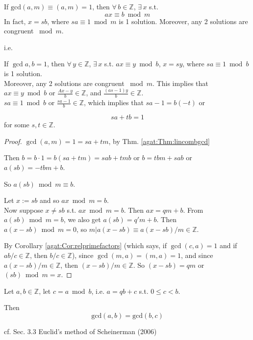 \begin{theorem}\label{agat:Thm:relprimeinvertible} 
If $\text{gcd}(a,m) \equiv (a,m) = 1$, then $\forall \, b \in \mathbb{Z}$, $\exists \, x $ s.t. 
\[
ax \equiv b\bmod{m}
\]
In fact, $x=sb$, where $sa\equiv 1\bmod{m}$ is 1 solution.  Moreover, any 2 solutions are congruent $\bmod{m}$.

i.e.  

If $\gcd{a,b} = 1$, then $\forall \, y \in \mathbb{Z}$, $\exists \, x$ s.t. $ax \equiv y \bmod{b}$, $x=sy$, where $sa\equiv 1\bmod{b}$ is 1 solution.  \\
Moreover, any 2 solutions are congruent $\bmod{m}$.  This implies that    \\

$ax\equiv y \bmod{b}$ or $\frac{Ax-y}{b} \in \mathbb{Z}$, and $\frac{(as-1)y }{b} \in \mathbb{Z}$.  \\
$sa \equiv 1 \bmod{b}$ or $\frac{sa-1}{b} \in \mathbb{Z}$, which implies that $sa-1 = b(-t)$ or 

\[
sa + tb =1
\]
for some $s,t\in \mathbb{Z}$.  
\end{theorem}
\begin{proof}
$\gcd(a,m) = 1=sa+tm$, by Thm. \ref{agat:Thm:lincombgcd}   

Then $b=b\cdot 1=  b(sa+tm) = sab+tmb$ or $b=tbm+sab$ or $a(sb) = -tbm + b$.  

So $a(sb)\bmod{m}  \equiv b$.  

Let $x:= sb$ and so $ax \bmod{m}=b$.   \\
Now suppose $x \neq sb$ s.t. $ax\bmod{m}=b$.  Then $ax=qm +b$.  From $a(sb) \bmod{m}=b$, we also get $a(sb) = q'm + b$.  Then $a(x-sb) \bmod{m}=0$, so $m|a(x-sb) \equiv a(x-sb)/m\in \mathbb{Z}$.  

By Corollary \ref{agat:Cor:relprimefactors} (which says, if $\gcd(c,a)=1$ and if $ab/c\in\mathbb{Z}$, then $b/c \in \mathbb{Z}$), 
since $\gcd(m,a) = (m,a)=1$, and since $a(x-sb)/m \in \mathbb{Z}$, then $(x-sb)/m\in\mathbb{Z}$.  So $(x-sb)=qm$ or $(sb)\bmod{m} = x$.  


\end{proof}



\begin{proposition}\label{agat:Prop:commongcd}
Let $a,b\in \mathbb{Z}$, let $c=a\bmod{b}$, i.e. $a=qb+c$ s.t. $0\leq c <b$.  

Then 
\begin{equation}
\text{gcd}(a,b) = \text{gcd}(b,c)
\end{equation}
\end{proposition}
cf. Sec. 3.3 Euclid's method of Scheinerman (2006) \cite{agat:Sche2006}

